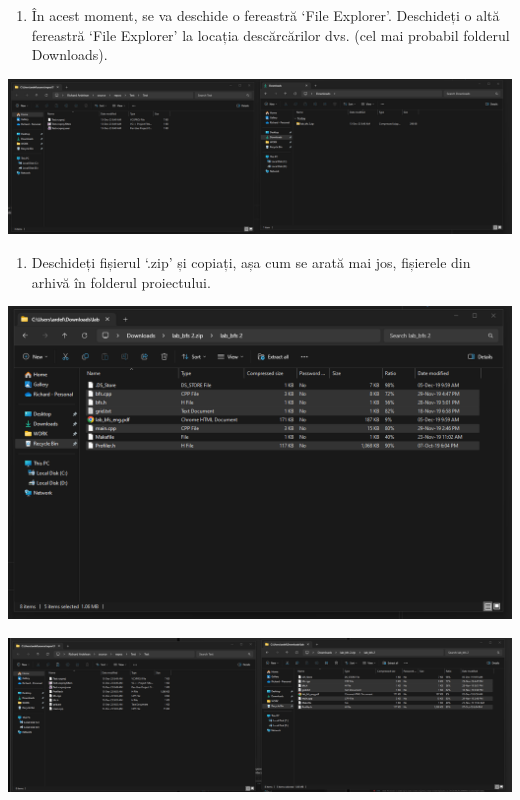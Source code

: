 \documentclass[../ro-fa-lab.tex]{subfiles}
\begin{document}
\begin{enumerate}
\def\labelenumi{\arabic{enumi}.}
\setcounter{enumi}{2}
\item
  În acest moment, se va deschide o fereastră `File Explorer'. Deschideți o altă fereastră `File Explorer' la locația descărcărilor dvs. (cel mai probabil folderul Downloads).
\end{enumerate}

\includegraphics[width=\textwidth,alt={A screenshot of a computer Description automatically generated}]{./Resources/tutorial_lab9/image3.png}

\begin{enumerate}
\def\labelenumi{\arabic{enumi}.}
\setcounter{enumi}{3}
\item
  Deschideți fișierul `.zip' și copiați, așa cum se arată mai jos, fișierele din arhivă în folderul proiectului.
\end{enumerate}

\includegraphics[width=\textwidth,alt={A screenshot of a computer Description automatically generated}]{./Resources/tutorial_lab9/image4.png}

\includegraphics[width=\textwidth,alt={A screenshot of a computer Description automatically generated}]{./Resources/tutorial_lab9/image5.png}
\end{document}
